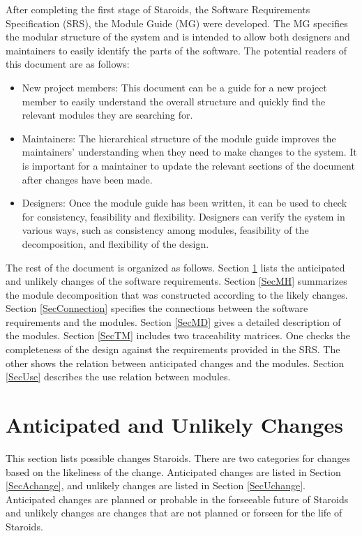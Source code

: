 \documentclass[12pt, titlepage]{article}
\begin{document}
After completing the first stage of Staroids, the Software Requirements Specification (SRS), the Module Guide (MG) were developed. The MG specifies the modular structure of the system and is intended to allow both designers and maintainers to easily identify the parts of the software.  The potential readers of this document are as follows:

\begin{itemize}
\item New project members: This document can be a guide for a new project member to easily understand the overall structure and quickly find the relevant modules they are searching for.
\item Maintainers: The hierarchical structure of the module guide improves the maintainers' understanding when they need to make changes to the system. It is important for a maintainer to update the relevant sections of the document after changes have been made.
\item Designers: Once the module guide has been written, it can be used to check for consistency, feasibility and flexibility. Designers can verify the system in various ways, such as consistency among modules, feasibility of the decomposition, and flexibility of the design.
\end{itemize}

The rest of the document is organized as follows. Section
\ref{SecChange} lists the anticipated and unlikely changes of the software requirements. Section \ref{SecMH} summarizes the module decomposition that was constructed according to the likely changes. Section \ref{SecConnection} specifies the connections between the software requirements and the modules. Section \ref{SecMD} gives a detailed description of the modules. Section \ref{SecTM} includes two traceability matrices. One checks the completeness of the design against the requirements provided in the SRS. The other shows the relation between anticipated changes and the modules. Section
\ref{SecUse} describes the use relation between modules.

\section{Anticipated and Unlikely Changes} \label{SecChange}

This section lists possible changes Staroids. There are two categories for changes based on the likeliness of the change. Anticipated changes are listed in Section \ref{SecAchange}, and unlikely changes are listed in Section \ref{SecUchange}. Anticipated changes are planned or probable in the forseeable future of Staroids and unlikely changes are changes that are not planned or forseen for the life of Staroids.
\end{document}
